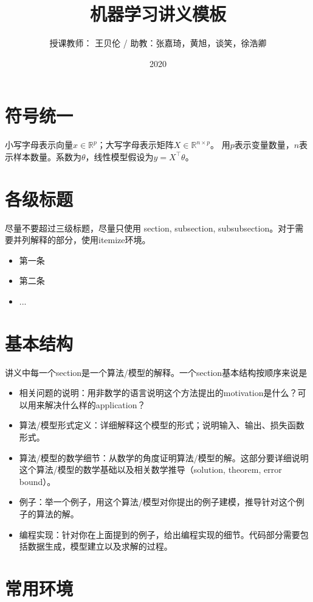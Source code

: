 \documentclass[a4paper,9pt]{extarticle}
\title{机器学习讲义模板}
\author{授课教师： 王贝伦  /  助教：张嘉琦，黄旭，谈笑，徐浩卿}
\date{2020}
\begin{document}
\maketitle

\begin{multicols*}{2}
\section{符号统一}
小写字母表示向量$x \in \mathbb{R}^{p}$；大写字母表示矩阵$X \in \mathbb{R}^{n \times p}$。
用$p$表示变量数量，$n$表示样本数量。系数为$\theta$，线性模型假设为$y = X^\top\theta$。

\section{各级标题}
    尽量不要超过三级标题，尽量只使用 section, subsection, subsubsection。对于需要并列解释的部分，使用itemize环境。
    
    \begin{itemize}
        \item 第一条
        \item 第二条
        \item ...
    \end{itemize}
    
    
\section{基本结构}
    讲义中每一个section是一个算法/模型的解释。一个section基本结构按顺序来说是
    \begin{itemize}
        \item [(1)] 相关问题的说明：用非数学的语言说明这个方法提出的motivation是什么？可以用来解决什么样的application？
        \item [(2)] 算法/模型形式定义：详细解释这个模型的形式；说明输入、输出、损失函数形式。
        \item [(3)] 算法/模型的数学细节：从数学的角度证明算法/模型的解。这部分要详细说明这个算法/模型的数学基础以及相关数学推导（solution, theorem, error bound）。
        \item [(4)] 例子：举一个例子，用这个算法/模型对你提出的例子建模，推导针对这个例子的算法的解。
        \item [(5)]编程实现：针对你在上面提到的例子，给出编程实现的细节。代码部分需要包括数据生成，模型建立以及求解的过程。
    \end{itemize}

\section{常用环境}


\end{multicols*}
\end{document}
